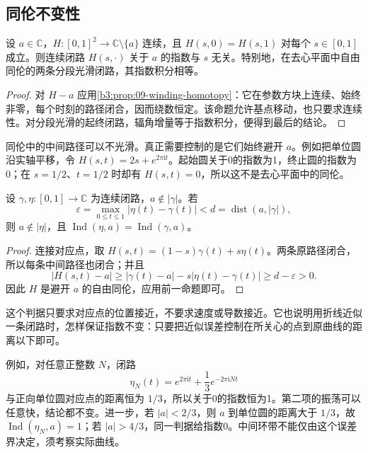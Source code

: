 \subsection{同伦不变性}
\label{b3:subsec:100102}

\begin{proposition}\label{b3:prop:10-index-homotopy}
设 \(a\in\mathbb C\)，\(H:[0,1]^2\to\mathbb C\setminus\{a\}\) 连续，且 \(H(s,0)=H(s,1)\) 对每个 \(s\in[0,1]\) 成立。则连续闭路 \(H(s,\cdot)\) 关于 \(a\) 的指数与 \(s\) 无关。特别地，在去心平面中自由同伦的两条分段光滑闭路，其指数积分相等。
\end{proposition}
\begin{proof}
对 \(H-a\) 应用\cref{b3:prop:09-winding-homotopy}：它在参数方块上连续、始终非零，每个时刻的路径闭合，因而绕数恒定。该命题允许基点移动，也只要求连续性。对分段光滑的起终闭路，辐角增量等于指数积分，便得到最后的结论。
\end{proof}
同伦中的中间路径可以不光滑。真正需要控制的是它们始终避开 \(a\)。例如把单位圆沿实轴平移，令 \(H(s,t)=2s+e^{2\pi\mathrm i t}\)。起始圆关于0的指数为1，终止圆的指数为0；在 \(s=1/2\)、\(t=1/2\) 时却有 \(H(s,t)=0\)，所以这不是去心平面中的同伦。

\begin{proposition}\label{b3:prop:10-index-small-perturbation}
设 \(\gamma,\eta:[0,1]\to\mathbb C\) 为连续闭路，\(a\notin|\gamma|\)。若
\[
 \varepsilon=\max_{0\le t\le1}|\eta(t)-\gamma(t)|
 <d=\operatorname{dist}(a,|\gamma|),
\]
则 \(a\notin|\eta|\)，且 \(\operatorname{Ind}(\eta,a)=\operatorname{Ind}(\gamma,a)\)。
\end{proposition}
\begin{proof}
连接对应点，取 \(H(s,t)=(1-s)\gamma(t)+s\eta(t)\)。两条原路径闭合，所以每条中间路径也闭合；并且
\[
 |H(s,t)-a|
 \ge|\gamma(t)-a|-s|\eta(t)-\gamma(t)|
 \ge d-\varepsilon>0.
\]
因此 \(H\) 是避开 \(a\) 的自由同伦，应用前一命题即可。
\end{proof}
这个判据只要求对应点的位置接近，不要求速度或导数接近。它也说明用折线近似一条闭路时，怎样保证指数不变：只要把近似误差控制在所关心的点到原曲线的距离以下即可。

\ProseParagraphBreak
例如，对任意正整数 \(N\)，闭路
\[
 \eta_N(t)=e^{2\pi\mathrm i t}+\frac13e^{-2\pi\mathrm i Nt}
\]
与正向单位圆对应点的距离恒为 \(1/3\)，所以关于0的指数恒为1。第二项的振荡可以任意快，结论都不变。进一步，若 \(|a|<2/3\)，则 \(a\) 到单位圆的距离大于 \(1/3\)，故 \(\operatorname{Ind}(\eta_N,a)=1\)；若 \(|a|>4/3\)，同一判据给指数0。中间环带不能仅由这个误差界决定，须考察实际曲线。

